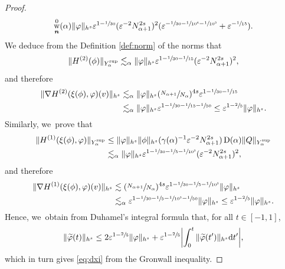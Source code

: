 \documentclass[10pt,a4paper]{amsart}
\DeclareMathOperator{\rw}{w}
\theoremstyle{plain}
\theoremstyle{definition}
\newcommand{\nb}{{\boldsymbol n}}
\newcommand{\1}{\mathbf{1}}
\newcommand{\Ysup}[1]{Y_{#1}^{\mathrm{sup}}}
\let\epsilon\varepsilon
\begin{document}
\begin{proof}
\begin{align*}
\rw_{\nb}^{0}(\alpha)
\|\varphi\|_{h^{s}}
\epsilon^{1-\sfrac{1}{30}}
(\epsilon^{-2}N_{\alpha+1}^{2s})^{2}
(
\epsilon^{-\sfrac{1}{30}-\sfrac{1}{10^{4}}-\sfrac{1}{10^{3}}}+\epsilon^{-\sfrac{1}{15}}
).
\end{align*}
We deduce from the Definition \ref{def:norm} of the norms that\vspace*{-3pt}
\[
\|H^{(2)}(\phi)\|_{\Ysup{\alpha}}
\lesssim_{\alpha}
\|\varphi\|_{h^{s}}\epsilon^{1-\sfrac{1}{30}-\sfrac{1}{15}}(\epsilon^{-2}N_{\alpha+1}^{2s})^{2},
\]
and therefore\vspace*{-3pt}
\begin{equation*}
\begin{split}
\|\nabla H^{(2)}(\xi(\phi),\varphi)(v)\|_{h^{s}}
&\lesssim_{\alpha} \|\varphi\|_{h^{s}}(\sfrac{N_{\alpha+1}}{N_{\alpha}})^{4s}\epsilon^{1-\sfrac{1}{30}-\sfrac{1}{15}}\\
&\lesssim_{\alpha}\|\varphi\|_{h^{s}}
\epsilon^{1-\sfrac{1}{30}-\sfrac{1}{15}-\sfrac{1}{50}}
\leq \epsilon^{1-\sfrac{2}{5}}\|\varphi\|_{h^{s}}.
\end{split}
\end{equation*}
Similarly, we~prove that\vspace*{-3pt}
\begin{align*}
\|H^{(1)}(\xi(\phi),\varphi)\|_{\Ysup{\alpha}}
&\leq \|\varphi\|_{h^{s}}\|\phi\|_{h^{s}}(\gamma(\alpha)^{-1}\epsilon^{-2}N_{\alpha+1}^{2s})\operatorname{D}(\alpha)\|Q\|_{\Ysup{\alpha}} \\
&\lesssim_{\alpha}
\|\varphi\|_{h^{s}}
\epsilon^{1-\sfrac{1}{30}-\sfrac{1}{5}-\sfrac{1}{10^{3}}}(\epsilon^{-2}N_{\alpha+1}^{2s})^{2},
\end{align*}
and therefore\vspace*{-3pt}
\begin{equation*}
\begin{split}
\|\nabla H^{(1)}(\xi(\phi),\varphi)(v)\|_{h^{s}}
&\lesssim
(\sfrac{N_{\alpha+1}}{N_{\alpha}})^{4s}\epsilon^{1-\sfrac{1}{30}-\sfrac{1}{5}-\sfrac{1}{10^{3}}}
\|\varphi\|_{h^{s}}\\
&\lesssim_{\alpha}
\epsilon^{1-\sfrac{1}{30}-\sfrac{1}{5}-\sfrac{1}{10^{3}}-\sfrac{1}{50}}
\|\varphi\|_{h^{s}}
\leq
\epsilon^{1-\sfrac{2}{5}}\|\varphi\|_{h^{s}}.
\end{split}
\end{equation*}
Hence, we~obtain from Duhamel's integral formula that, for all $t\in[-1,1]$,\vspace*{-3pt}
\[
\|\widetilde{\varphi}(t)
\|_{h^{s}}
\leq
2\epsilon^{1-\sfrac{2}{5}}\|\varphi\|_{h^{s}} +\epsilon^{1-\sfrac{2}{5}}\biggl|\int_{0}^{t}\|\widetilde{\varphi}(t')\|_{h^{s}}\mathrm{d}t'\biggr|,
\]
which in turn gives \eqref{eq:dxi} from the Gronwall inequality.
\end{proof}
\end{document}
